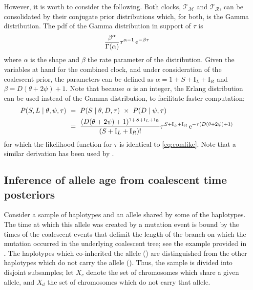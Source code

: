 However, it is worth to consider the following.
Both clocks, $\mathcal{T_{\!\!M}}$ and $\mathcal{T_{\!R}}$, can be consolidated by their conjugate prior distributions which, for both, is the Gamma distribution.
The \gls{pdf} of the Gamma distribution in support of $\tau$ is
\begin{equation*}
	\frac{\beta^\alpha}{\Gamma(\alpha)} \tau^{\alpha - 1} \,\mathrm{e}^{-\beta \tau}
\end{equation*}
where $\alpha$ is the shape and $\beta$ the rate parameter of the distribution.
Given the variables at hand for the combined clock, and under consideration of the coalescent prior, the parameters can be defined as ${\alpha = 1+ S + \mathrm{I}_L + \mathrm{I}_R}$ and ${\beta = D(\theta + 2 \psi) + 1}$.
Note that because $\alpha$ is an integer, the Erlang distribution can be used instead of the Gamma distribution, \eg to facilitate faster computation;
\begin{equation}\label{eq:comgamma}
\begin{split}
	P(S,L \mid \theta,\psi,\tau)
	& ~ = ~ P(S \mid \theta,D,\tau) ~\times~ P(D \mid \psi,\tau) \\
	& ~ = ~ \frac{(D(\theta + 2\psi) + 1)^{1 + S + \mathrm{I}_L + \mathrm{I}_R}}{(S + \mathrm{I}_L + \mathrm{I}_R)!} \tau^{S + \mathrm{I}_L + \mathrm{I}_R} \,\mathrm{e}^{-\tau (D(\theta + 2\psi) + 1)}
\end{split}
\end{equation}
for which the likelihood function for $\tau$ is identical to \cref{eq:comlike}.
Note that a similar derivation has been used by \citet{schroff2016}.





%
\subsection{Inference of allele age from coalescent time posteriors}\label{sec:comp_post_method}
%

Consider a sample of haplotypes and an allele shared by some of the haplotypes.
The time at which this allele was created by a mutation event is bound by the times of the  coalescent events that delimit the length of the branch on which the mutation occurred in the underlying coalescent tree; see the example provided in .
The haplotypes which co-inherited the allele () are distinguished from the other haplotypes which do not carry the allele ().
Thus, the sample is divided into  disjoint subsamples; let $X_c$ denote the set of chromosomes which share a given allele, and $X_d$ the set of chromosomes which do not carry that allele.

